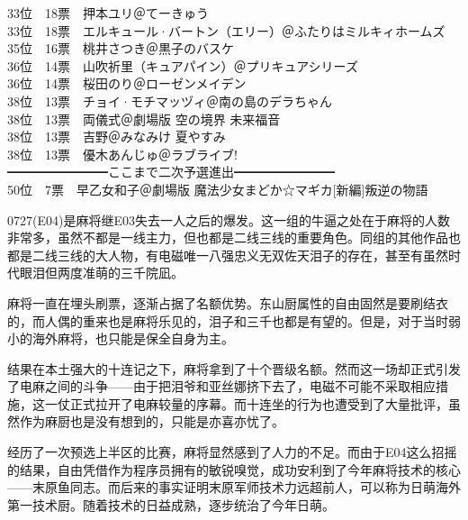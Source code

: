 {    33位　18票　押本ユリ＠てーきゅう                                                                                \\
    33位　18票　エルキュール·バートン（エリー）＠ふたりはミルキィホームズ                                          \\
    35位　16票　桃井さつき＠黒子のバスケ                                                                            \\
    36位　14票　山吹祈里（キュアパイン）＠プリキュアシリーズ                                                        \\
    36位　14票　桜田のり＠ローゼンメイデン                                                                          \\
    38位　13票　チョイ·モチマッヅィ＠南の島のデラちゃん                                                            \\
    38位　13票　両儀式＠劇場版 空の境界 未来福音                                                                    \\
    38位　13票　吉野＠みなみけ 夏やすみ                                                                             \\
    38位　13票　優木あんじゅ＠ラブライブ!                                                                           \\
    ━━━━━━━━ここまで二次予選進出━━━━━━━━                                                            \\
    50位　7票　早乙女和子＠劇場版 魔法少女まどか☆マギカ[新編]叛逆の物語
}

0727(E04)是麻将继E03失去一人之后的爆发。这一组的牛逼之处在于麻将的人数非常多，虽然不都是一线主力，但也都是二线三线的重要角色。同组的其他作品也都是二线三线的大人物，有电磁唯一八强忠义无双佐天泪子的存在，甚至有虽然时代眼泪但两度准萌的三千院凪。

麻将一直在埋头刷票，逐渐占据了名额优势。东山厨属性的自由固然是要刷结衣的，而人偶的重来也是麻将乐见的，泪子和三千也都是有望的。但是，对于当时弱小的海外麻将，也只能是保全自身为主。

结果在本土强大的十连记之下，麻将拿到了十个晋级名额。然而这一场却正式引发了电麻之间的斗争——由于把泪爷和亚丝娜挤下去了，电磁不可能不采取相应措施，这一仗正式拉开了电麻较量的序幕。而十连坐的行为也遭受到了大量批评，虽然作为麻厨也是没有想到的，只能是亦喜亦忧了。

经历了一次预选上半区的比赛，麻将显然感到了人力的不足。而由于E04这么招摇的结果，自由凭借作为程序员拥有的敏锐嗅觉，成功安利到了今年麻将技术的核心——末原鱼同志。而后来的事实证明末原军师技术力远超前人，可以称为日萌海外第一技术厨。随着技术的日益成熟，逐步统治了今年日萌。

